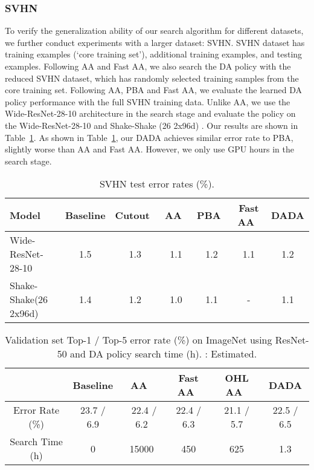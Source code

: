 \documentclass[runningheads]{llncs}
\begin{document}
\subsubsection{SVHN}
To verify the generalization ability of our search algorithm for different datasets, we further conduct experiments with a larger dataset: SVHN. 
SVHN dataset has  training examples (`core training set'),  additional training examples, and  testing examples.
Following
AA and Fast AA, we also search the DA  policy with the reduced SVHN dataset, which has  randomly selected training samples from the core training set.
{Following AA, PBA and Fast AA}, we evaluate the learned DA policy performance with the full SVHN training data.
Unlike AA, we use the Wide-ResNet-28-10 \cite{DBLP:conf/bmvc/ZagoruykoK16} architecture in the search stage and evaluate the policy on the Wide-ResNet-28-10 \cite{DBLP:conf/bmvc/ZagoruykoK16} and Shake-Shake (26 2x96d) \cite{DBLP:conf/iclr/Gastaldi17}. Our results are shown in  Table~\ref{tab:svhn}.
As shown in Table~\ref{tab:svhn}, our DADA achieves
similar error rate to PBA,  slightly worse than AA and Fast AA. However, we only use 
 GPU hours in the search stage.


\begin{table}[t]
	\centering
	\caption{{SVHN test error rates (\%).}}
	\begin{tabular}{l|ccccc|c}
		\toprule
		Model & Baseline & Cutout~\cite{DBLP:journals/corr/abs-1708-04552} & AA~\cite{DBLP:conf/cvpr/CubukZMVL19} & PBA~\cite{DBLP:conf/icml/HoLCSA19}   & Fast AA~\cite{DBLP:conf/nips/LimKKKK19} & \textbf{DADA} \\
		\midrule
		Wide-ResNet-28-10 & 1.5   & 1.3   & 1.1   & 1.2   & 1.1   & 1.2 \\
		Shake-Shake(26 2x96d) & 1.4   & 1.2   & 1.0  & 1.1  & -     & 1.1 \\
		\bottomrule
	\end{tabular}\label{tab:svhn}\end{table}
\begin{table}[t]
	\centering
	\caption{{Validation set Top-1 / Top-5 error rate (\%) on ImageNet using ResNet-50 and DA policy search time (h). : Estimated. }}
	\begin{tabular}{c|cccc|c}
		\toprule
		 &Baseline &  AA~\cite{DBLP:conf/cvpr/CubukZMVL19}& Fast AA~\cite{DBLP:conf/nips/LimKKKK19}& OHL AA~\cite{Lin_2019_ICCV} & \textbf{DADA} \\
		\midrule
		Error Rate (\%) & 23.7 / 6.9 & ~22.4 / 6.2 & 22.4 / 6.3 & 21.1 / 5.7 & 22.5 / 6.5 \\
		Search Time (h)	 & 0 & 15000 & 450 & 625 & 1.3 \\
		\bottomrule
	\end{tabular}\label{tab:imagenet}\end{table}
\end{document}
